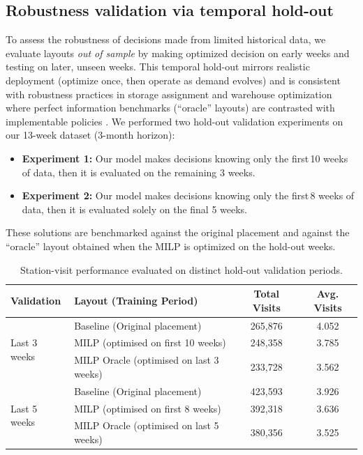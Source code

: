 \documentclass[11pt]{elsarticle}
\begin{document}
\subsection{Robustness validation via temporal hold-out}\label{sec:temporal_validation}

To assess the robustness of decisions made from limited historical data, we evaluate layouts \emph{out of sample} by making optimized decision on early weeks and testing on later, unseen weeks. This temporal hold-out mirrors realistic deployment (optimize once, then operate as demand evolves) and is consistent with robustness practices in storage assignment and warehouse optimization where perfect information benchmarks (``oracle'' layouts) are contrasted with implementable policies \citep{lee2020cie,wang2020}. We performed two hold-out validation experiments on our 13-week dataset (3-month horizon):

\begin{itemize}
  \item \textbf{Experiment 1:} Our model makes decisions knowing only the first\,10 weeks of data, then it is evaluated on the remaining 3 weeks.  

  \item \textbf{Experiment 2:} Our model makes decisions knowing only the first\,8 weeks of data, then it is evaluated solely on the final 5 weeks.

\end{itemize}

These solutions are benchmarked against the original placement and against the “oracle” layout obtained when the MILP is optimized on the hold-out weeks.




\begin{table}[H]
\centering
\small
\renewcommand{\arraystretch}{1.15}
\setlength{\tabcolsep}{8pt}
\begin{tabular}{@{}llcc@{}}
\toprule
\textbf{Validation} & \textbf{Layout (Training Period)} & \textbf{Total Visits} & \textbf{Avg. Visits} \\
\midrule
\multirow{3}{*}{Last 3 weeks} & Baseline (Original placement) & 265,876 & 4.052 \\
& MILP (optimised on first 10 weeks) & 248,358 & 3.785 \\
& MILP Oracle (optimised on last 3 weeks) & 233,728 & 3.562 \\
\midrule
\multirow{3}{*}{Last 5 weeks} & Baseline (Original placement) & 423,593 & 3.926 \\
& MILP (optimised on first 8 weeks) & 392,318 & 3.636 \\
& MILP Oracle (optimised on last 5 weeks) & 380,356 & 3.525 \\
\bottomrule
\end{tabular}
\caption{Station-visit performance evaluated on distinct hold-out validation periods.}
\label{tab:temporal_validation}
\end{table}
\end{document}
